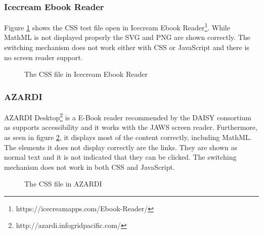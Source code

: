 \subsubsection{Icecream Ebook Reader}
Figure \ref{fig:Icecream} shows the CSS test file open in Icecream Ebook Reader\footnote{https://icecreamapps.com/Ebook-Reader/}. While MathML is not displayed properly the SVG and PNG are shown correctly. The switching mechanism does not work either with CSS or JavaScript and there is no screen reader support.
\begin{figure}[H]
	\centering
		\caption{The CSS file in Icecream Ebook Reader}
	\label{fig:Icecream}
\end{figure}

\subsubsection{AZARDI}
AZARDI Desktop\footnote{http://azardi.infogridpacific.com/} is a E-Book reader recommended by the DAISY consortium \cite{daisyAZARDI} as supports accessibility and it works with the JAWS screen reader. Furthermore, as seen in figure \ref{fig:AZARDI}, it displays most of the content correctly, including MathML. The elements it does not display correctly are the links. They are shown as normal text and it is not indicated that they can be clicked. The switching mechanism does not work in both CSS and JavaScript.
\begin{figure}[H]
	\centering
	\caption{The CSS file in AZARDI}
	\label{fig:AZARDI}
\end{figure}


